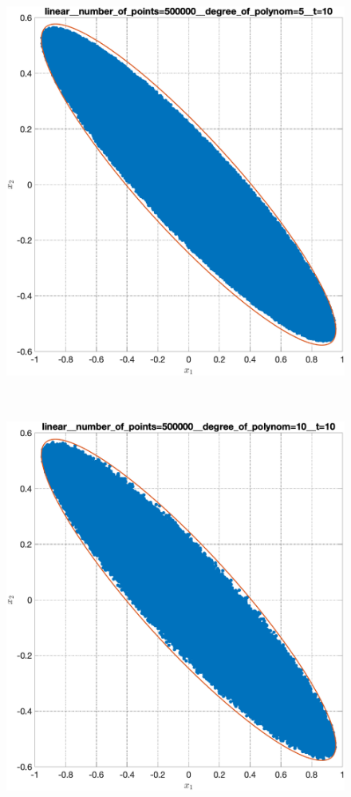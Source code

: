 \documentclass[../main.tex]{subfiles}
\begin{document}
\begin{figure}[ht!]
\begin{minipage}[b]{.3\linewidth}
 		\includegraphics[width=\linewidth]{images/linear__number_of_points=500000__degree_of_polynom=5__t=10.eps}
 	\end{minipage} 
 	\hfill
 	\begin{minipage}[b]{.3\linewidth} 
 		\small
 		\centering
 		\includegraphics[width=\linewidth]{images/linear__number_of_points=500000__degree_of_polynom=10__t=10.eps}

\end{minipage}
\end{figure}
\end{document}
